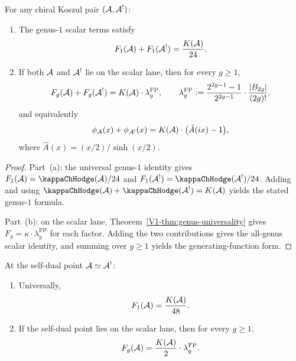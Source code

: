\begin{theorem}
\label{thm:thqg-IV-free-energy}
For any chiral Koszul pair $(\mathcal{A}, \mathcal{A}^!)$:
\begin{enumerate}[label=\textup{(\alph*)}]
\item The genus-$1$ scalar terms satisfy
\begin{equation}%
F_1(\cA) + F_1(\cA^!)
= \frac{K(\cA)}{24}.
\end{equation}
\item If both $\mathcal{A}$ and $\mathcal{A}^!$ lie on the scalar lane,
then for every $g \geq 1$,
\begin{equation}%
F_g(\cA) + F_g(\cA^!)
= K(\cA) \cdot \lambda_g^{\mathrm{FP}},
\qquad
\lambda_g^{\mathrm{FP}}
:= \frac{2^{2g-1}-1}{2^{2g-1}} \cdot \frac{|B_{2g}|}{(2g)!}.
\end{equation}
and equivalently
\begin{equation}%
\phi_\cA(x) + \phi_{\cA^!}(x)
= K(\cA) \cdot \bigl(\hat{A}(ix) - 1\bigr),
\end{equation}
where $\hat{A}(x) = (x/2)/\sinh(x/2)$.
\end{enumerate}
\end{theorem}

\begin{proof}
Part~(a): the universal genus-$1$ identity gives
$F_1(\cA) = \kappaChHodge(\cA)/24$ and
$F_1(\cA^!) = \kappaChHodge(\cA^!)/24$.
Adding and using $\kappaChHodge(\cA) + \kappaChHodge(\cA^!) = K(\cA)$ yields the
stated genus-$1$ formula.

Part~(b): on the scalar lane,
Theorem~\ref{V1-thm:genus-universality} gives
$F_g = \kappa \cdot \lambda_g^{\mathrm{FP}}$ for each factor.
Adding the two contributions gives the all-genus scalar identity, and
summing over $g \geq 1$ yields the generating-function form.
\end{proof}

\begin{corollary}
At the self-dual point $\mathcal{A} \simeq \mathcal{A}^!$:
\begin{enumerate}[label=\textup{(\alph*)}]
\item Universally,
\[
 F_1(\mathcal{A}) = \frac{K(\mathcal{A})}{48}.
\]
\item If the self-dual point lies on the scalar lane,
then for every $g \geq 1$,
\[
 F_g(\mathcal{A}) = \frac{K(\mathcal{A})}{2} \cdot \lambda_g^{\mathrm{FP}}.
\]
\end{enumerate}
\end{corollary}

